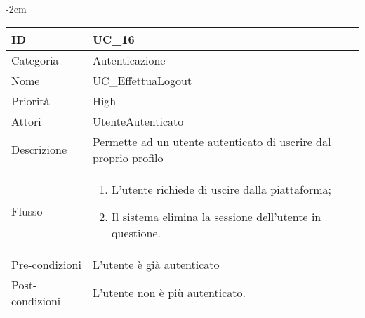 \begin{center}
\begin{table}[bp]
    \centering
    \addtolength{\leftskip} {-2cm}
\begin{tabular}{ |p{2.6cm}|p{13cm}|  }
\hline
ID & UC\_16\\\hline
Categoria & Autenticazione \\\hline
Nome & UC\_EffettuaLogout \\\hline
Priorità & High \\\hline
Attori &  UtenteAutenticato \\\hline
Descrizione & Permette ad un utente autenticato di uscrire dal proprio profilo \\\hline
Flusso &  	\vspace{-5mm} \begin{enumerate}
			\item L'utente richiede di uscire dalla piattaforma;
			\item Il sistema elimina la sessione dell'utente in questione.
		\end{enumerate}\\\hline
Pre-condizioni &  L'utente è già autenticato\\\hline
Post-condizioni &  L'utente non è più autenticato.\\\hline
\end{tabular}
\label{table_use_case:16}\newline
\end{table}


\end{center}
